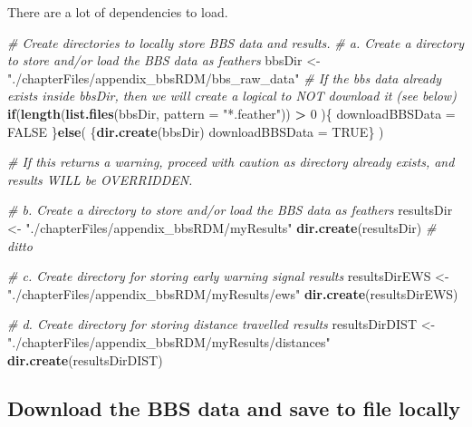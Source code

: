 \documentclass[12pt,twoside,openany]{reedthesis}
\newenvironment{Shaded}{\begin{snugshade}}{\end{snugshade}}
\newcommand{\CommentTok}[1]{\textcolor[rgb]{0.56,0.35,0.01}{\textit{#1}}}
\newcommand{\ControlFlowTok}[1]{\textcolor[rgb]{0.13,0.29,0.53}{\textbf{#1}}}
\newcommand{\DataTypeTok}[1]{\textcolor[rgb]{0.13,0.29,0.53}{#1}}
\newcommand{\DecValTok}[1]{\textcolor[rgb]{0.00,0.00,0.81}{#1}}
\newcommand{\KeywordTok}[1]{\textcolor[rgb]{0.13,0.29,0.53}{\textbf{#1}}}
\newcommand{\NormalTok}[1]{#1}
\newcommand{\OperatorTok}[1]{\textcolor[rgb]{0.81,0.36,0.00}{\textbf{#1}}}
\newcommand{\OtherTok}[1]{\textcolor[rgb]{0.56,0.35,0.01}{#1}}
\newcommand{\StringTok}[1]{\textcolor[rgb]{0.31,0.60,0.02}{#1}}
\begin{document}
There are a lot of dependencies to load.
\begin{Shaded}
\begin{Highlighting}[]
\CommentTok{# Create directories to locally store BBS data and results.}
\CommentTok{# a. Create a directory to store and/or load the BBS data as feathers}
\NormalTok{bbsDir <-}\StringTok{ "./chapterFiles/appendix_bbsRDM/bbs_raw_data"}
    \CommentTok{# If the bbs data already exists inside bbsDir, then we will create a logical to NOT download it (see below)}
        \ControlFlowTok{if}\NormalTok{(}\KeywordTok{length}\NormalTok{(}\KeywordTok{list.files}\NormalTok{(bbsDir, }\DataTypeTok{pattern =} \StringTok{"*.feather"}\NormalTok{)) }\OperatorTok{>}\StringTok{ }\DecValTok{0}\NormalTok{ )\{}
\NormalTok{            downloadBBSData =}\StringTok{ }\OtherTok{FALSE}
\NormalTok{        \}}\ControlFlowTok{else}\NormalTok{(}
\NormalTok{            \{}\KeywordTok{dir.create}\NormalTok{(bbsDir)}
\NormalTok{            downloadBBSData =}\StringTok{ }\OtherTok{TRUE}\NormalTok{\}}
\NormalTok{            )}

\CommentTok{# If this returns a warning, proceed with caution as directory already exists, and results WILL be OVERRIDDEN.}

\CommentTok{# b. Create a directory to store and/or load the BBS data as feathers}
\NormalTok{resultsDir <-}\StringTok{ "./chapterFiles/appendix_bbsRDM/myResults"}
\KeywordTok{dir.create}\NormalTok{(resultsDir)}
\CommentTok{# ditto}

\CommentTok{# c. Create directory for storing early warning signal results}
\NormalTok{resultsDirEWS <-}\StringTok{ "./chapterFiles/appendix_bbsRDM/myResults/ews"}
\KeywordTok{dir.create}\NormalTok{(resultsDirEWS)}

\CommentTok{# d. Create directory for storing distance travelled results}
\NormalTok{resultsDirDIST <-}\StringTok{ "./chapterFiles/appendix_bbsRDM/myResults/distances"}
\KeywordTok{dir.create}\NormalTok{(resultsDirDIST)}
\end{Highlighting}
\end{Shaded}
\hypertarget{download-the-bbs-data-and-save-to-file-locally}{%
\subsection{Download the BBS data and save to file locally}\label{download-the-bbs-data-and-save-to-file-locally}}
\end{document}
